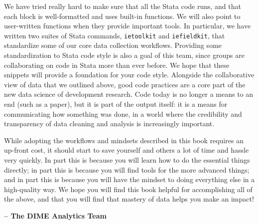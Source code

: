 We have tried really hard to make sure that all the Stata code runs,
and that each block is well-formatted and uses built-in functions.
We will also point to user-written functions when they provide important tools.
In particular, we have written two suites of Stata commands,
\texttt{ietoolkit} and \texttt{iefieldkit},
that standardize some of our core data collection workflows.
Providing some standardization to Stata code style is also a goal of this team,
since groups are collaborating on code in Stata more than ever before.
We hope
that these snippets will provide a foundation for your code style.
Alongside the collaborative view of data that we outlined above,
good code practices are a core part of the new data science of development research.
Code today is no longer a means to an end (such as a paper),
but it is part of the output itself: it is a means for communicating how something was done,
in a world where the credibility and transparency of data cleaning and analysis is increasingly important.

While adopting the workflows and mindsets described in this book
requires an up-front cost,
it should start to save yourself and others a lot of time and hassle very quickly.
In part this is because you will learn how to do the essential things directly;
in part this is because you will find tools for the more advanced things;
and in part this is because you will have the mindset to doing everything else in a high-quality way.
We hope you will find this book helpful for accomplishing all of the above,
and that you will find that mastery of data helps you make an impact!

\textbf{-- The DIME Analytics Team}

\mainmatter
